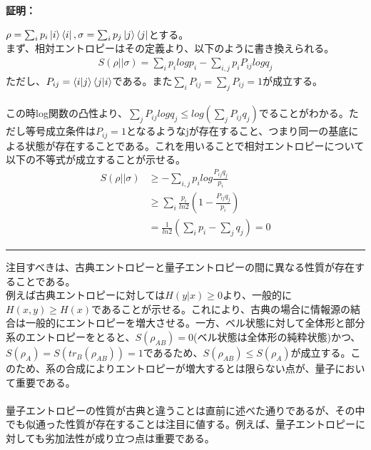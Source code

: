 \documentclass[a4paper,10.5pt]{article}
\numberwithin{equation}{section}
\newenvironment{proofbox}
{\begin{prooflabel}\textbf{証明：}\end{prooflabel}\vspace{0.8em}}
{\par\vspace{1em}\hrule\vspace{1em}}
\begin{document}
\begin{proofbox}
$\rho=\sum_{i}p_{i}\ket{i}\bra{i},\sigma=\sum_{i}p_{j}\ket{j}\bra{j}$とする。\\
まず、相対エントロピーはその定義より、以下のように書き換えられる。
\begin{equation}\begin{split}
    S(\rho||\sigma)=\sum_{i}p_{i}logp_{i}-\sum_{i,j}p_{i}P_{ij}logq_{j}
\end{split} \end{equation}
ただし、$P_{ij}=\bra{i}\ket{j}\bra{j}\ket{i}$である。また$\sum_{i}P_{ij}=\sum_{j}P_{ij}=1$が成立する。\\
\\
この時log関数の凸性より、$\sum_{j}P_{ij}logq_{j}\leq log(\sum_{j}P_{ij}q_{j})$でることがわかる。ただし等号成立条件は$P_{ij}=1$となるようなjが存在すること、つまり同一の基底による状態が存在することである。これを用いることで相対エントロピーについて以下の不等式が成立することが示せる。
\begin{equation}\begin{split}
    S(\rho||\sigma)&\geq -\sum_{i,j}p_{i}log\frac{P_{ij}q_{j}}{p_{i}}\\
    &\geq \sum_{i}\frac{p_{i}}{ln2}(1-\frac{P_{ij}q_{j}}{p_{i}})\\
    &=\frac{1}{ln2}(\sum_{i}p_{i}-\sum_{j}q_{j})=0
\end{split} \end{equation}
\end{proofbox}
注目すべきは、古典エントロピーと量子エントロピーの間に異なる性質が存在することである。\\
例えば古典エントロピーに対しては$H(y|x)\geq 0$より、一般的に$H(x,y)\geq H(x)$であることが示せる。これにより、古典の場合に情報源の結合は一般的にエントロピーを増大させる。一方、ベル状態に対して全体形と部分系のエントロピーをとると、$S(\rho_{AB})=0$(ベル状態は全体形の純粋状態)かつ、$S(\rho_{A})=S(tr_{B}(\rho_{AB}))=1$であるため、$S(\rho_{AB})\leq S(\rho_{A})$が成立する。このため、系の合成によりエントロピーが増大するとは限らない点が、量子において重要である。\\
\\
量子エントロピーの性質が古典と違うことは直前に述べた通りであるが、その中でも似通った性質が存在することは注目に値する。例えば、量子エントロピーに対しても劣加法性が成り立つ点は重要である。
\end{document}
